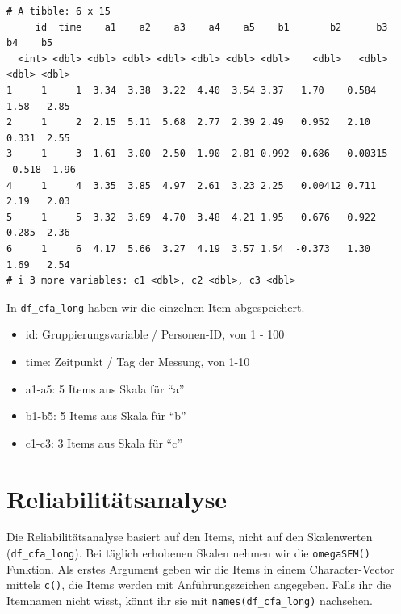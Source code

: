 \documentclass[
  letterpaper,
  DIV=11,
  numbers=noendperiod]{scrreprt}
\newenvironment{Shaded}{\begin{snugshade}}{\end{snugshade}}
\newcommand{\AttributeTok}[1]{\textcolor[rgb]{0.40,0.45,0.13}{#1}}
\newcommand{\FunctionTok}[1]{\textcolor[rgb]{0.28,0.35,0.67}{#1}}
\newcommand{\NormalTok}[1]{\textcolor[rgb]{0.00,0.23,0.31}{#1}}
\newcommand{\OtherTok}[1]{\textcolor[rgb]{0.00,0.23,0.31}{#1}}
\newcommand{\SpecialCharTok}[1]{\textcolor[rgb]{0.37,0.37,0.37}{#1}}
\newcommand{\StringTok}[1]{\textcolor[rgb]{0.13,0.47,0.30}{#1}}
\providecommand{\tightlist}{%
  \setlength{\itemsep}{0pt}\setlength{\parskip}{0pt}}\usepackage{longtable,booktabs,array}
\begin{document}
\begin{verbatim}
# A tibble: 6 x 15
     id  time    a1    a2    a3    a4    a5    b1       b2      b3     b4    b5
  <int> <dbl> <dbl> <dbl> <dbl> <dbl> <dbl> <dbl>    <dbl>   <dbl>  <dbl> <dbl>
1     1     1  3.34  3.38  3.22  4.40  3.54 3.37   1.70    0.584    1.58   2.85
2     1     2  2.15  5.11  5.68  2.77  2.39 2.49   0.952   2.10     0.331  2.55
3     1     3  1.61  3.00  2.50  1.90  2.81 0.992 -0.686   0.00315 -0.518  1.96
4     1     4  3.35  3.85  4.97  2.61  3.23 2.25   0.00412 0.711    2.19   2.03
5     1     5  3.32  3.69  4.70  3.48  4.21 1.95   0.676   0.922    0.285  2.36
6     1     6  4.17  5.66  3.27  4.19  3.57 1.54  -0.373   1.30     1.69   2.54
# i 3 more variables: c1 <dbl>, c2 <dbl>, c3 <dbl>
\end{verbatim}

In \texttt{df\_cfa\_long} haben wir die einzelnen Item abgespeichert.

\begin{itemize}
\tightlist
\item
  id: Gruppierungsvariable / Personen-ID, von 1 - 100
\item
  time: Zeitpunkt / Tag der Messung, von 1-10
\item
  a1-a5: 5 Items aus Skala für ``a''
\item
  b1-b5: 5 Items aus Skala für ``b''
\item
  c1-c3: 3 Items aus Skala für ``c''
\end{itemize}

\section{Reliabilitätsanalyse}\label{reliabilituxe4tsanalyse}

Die Reliabilitätsanalyse basiert auf den Items, nicht auf den
Skalenwerten (\texttt{df\_cfa\_long}). Bei täglich erhobenen Skalen
nehmen wir die \texttt{omegaSEM()} Funktion. Als erstes Argument geben
wir die Items in einem Character-Vector mittels \texttt{c()}, die Items
werden mit Anführungszeichen angegeben. Falls ihr die Itemnamen nicht
wisst, könnt ihr sie mit \texttt{names(df\_cfa\_long)} nachsehen.

\begin{Shaded}
\end{Shaded}
\end{document}
